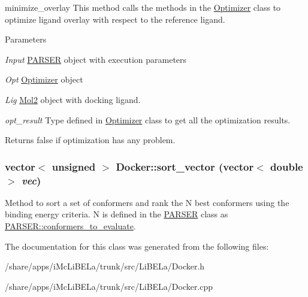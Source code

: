 minimize\_\-overlay This method calls the methods in the \hyperlink{classOptimizer}{Optimizer} class to optimize ligand overlay with respect to the reference ligand. 
\begin{DoxyParams}{Parameters}
\item[{\em Input}]\hyperlink{classPARSER}{PARSER} object with execution parameters \item[{\em Opt}]\hyperlink{classOptimizer}{Optimizer} object \item[{\em Lig}]\hyperlink{classMol2}{Mol2} object with docking ligand. \item[{\em opt\_\-result}]Type defined in \hyperlink{classOptimizer}{Optimizer} class to get all the optimization results. \end{DoxyParams}
\begin{DoxyReturn}{Returns}
false if optimization has any problem. 
\end{DoxyReturn}
\hypertarget{classDocker_aa0927d334d8b68434c293c13db7e03cc}{
\subsubsection[{sort\_\-vector}]{\setlength{\rightskip}{0pt plus 5cm}vector$<$ unsigned $>$ Docker::sort\_\-vector (vector$<$ double $>$ {\em vec})}}
\label{classDocker_aa0927d334d8b68434c293c13db7e03cc}
Method to sort a set of conformers and rank the N best conformers using the binding energy criteria. N is defined in the \hyperlink{classPARSER}{PARSER} class as \hyperlink{classPARSER_adef96790659375a8c00f2775794dec98}{PARSER::conformers\_\-to\_\-evaluate}. 

The documentation for this class was generated from the following files:\begin{DoxyCompactItemize}
\item 
/share/apps/iMcLiBELa/trunk/src/LiBELa/Docker.h\item 
/share/apps/iMcLiBELa/trunk/src/LiBELa/Docker.cpp\end{DoxyCompactItemize}
